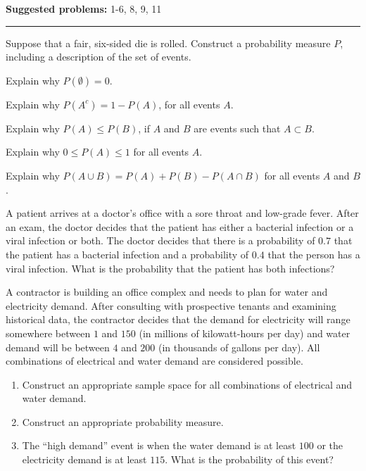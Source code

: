 \documentclass[12pt,reqno]{amsart}
\begin{document}
\textbf{Suggested problems:} 1-6, 8, 9, 11

\bigskip
\hrule

\bigskip

\prob Suppose that a fair, six-sided die is rolled. Construct a probability measure $P$, including a description of the set of events.

\vfill
\prob Explain why $P(\emptyset) = 0$.

\vfill
\prob Explain why $P(A^c) = 1 - P(A)$, for all events $A$.

\vfill
\prob Explain why $P(A) \leq P(B)$, if $A$ and $B$ are events such that $A\subset B$.

\vfill
\newpage
\prob Explain why $0\leq P(A) \leq 1$ for all events $A$.

\vfill
\prob Explain why $P(A\cup B) = P(A) + P(B) - P(A\cap B)$ for all events $A$ and $B$.

\vfill
\prob A patient arrives at a doctor’s office with a sore throat and low-grade fever. After an exam, the doctor decides that the patient has either a bacterial infection or a viral infection or both. The doctor decides that there is a probability of $0.7$ that the patient has a bacterial infection and a probability of $0.4$ that the person has a viral infection. What is the probability that the patient has both infections?

\vfill
\newpage
\prob A contractor is building an office complex and needs to plan for water and electricity demand. After consulting with prospective tenants and examining historical data, the contractor decides that the demand for electricity will range somewhere between $1$ and $150$ (in millions of kilowatt-hours per day) and water demand will be between $4$ and $200$ (in thousands
of gallons per day). All combinations of electrical and water demand are considered possible.

\medskip
\begin{enumerate}
\item Construct an appropriate sample space for all combinations of electrical and water demand.\vfill

\item Construct an appropriate probability measure.\vfill

\item The ``high demand'' event is when the water demand is at least $100$ or the electricity demand is at least $115$. What is the probability of this event?\vfill
\end{enumerate}
\end{document}
